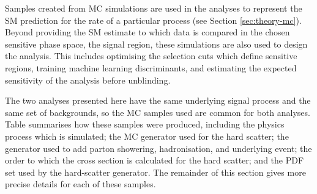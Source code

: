 
Samples created from \ac{MC} simulations are used in the analyses to represent
the \ac{SM} prediction for the rate of a particular process (see Section
\ref{sec:theory-mc}). Beyond providing the \ac{SM} estimate to which data is
compared in the chosen sensitive phase space, the signal region, these
simulations are also used to design the analysis. This includes optimising
the selection cuts which define sensitive regions, training machine learning
discriminants, and estimating the expected sensitivity of the analysis before
unblinding.

The two analyses presented here have the same underlying signal process and the
same set of backgrounds, so the \ac{MC} samples used are common for both
analyses. Table \label{tab:methods-data-triggers} summarises how these samples
were produced, including the physics process which is simulated; the \ac{MC}
generator used for the hard scatter; the generator used to add parton showering,
hadronisation, and underlying event; the order to which the cross section is
calculated for the hard scatter; and the \ac{PDF} set used by the hard-scatter
generator. The remainder of this section gives more precise details for each of
these samples.

